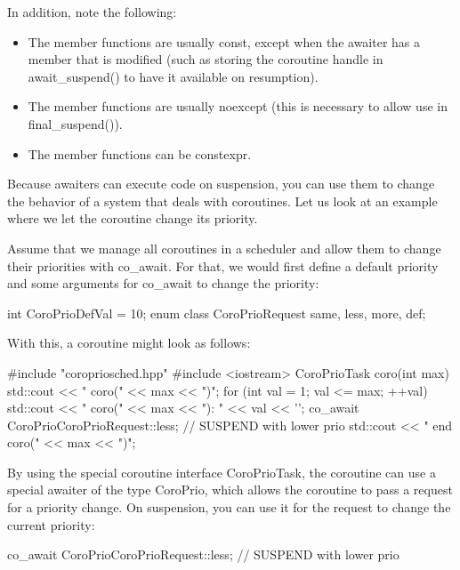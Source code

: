 In addition, note the following:

\begin{itemize}
\item 
The member functions are usually const, except when the awaiter has a member that is modified (such as storing the coroutine handle in await\_suspend() to have it available on resumption).

\item 
The member functions are usually noexcept (this is necessary to allow use in final\_suspend()).

\item 
The member functions can be constexpr.
\end{itemize}


Because awaiters can execute code on suspension, you can use them to change the behavior of a system that deals with coroutines. Let us look at an example where we let the coroutine change its priority.

Assume that we manage all coroutines in a scheduler and allow them to change their priorities with co\_await. For that, we would first define a default priority and some arguments for co\_await to change the priority:

\begin{cpp}
int CoroPrioDefVal = 10;
enum class CoroPrioRequest {same, less, more, def};
\end{cpp}

With this, a coroutine might look as follows:


\begin{cpp}
#include "coropriosched.hpp"
#include <iostream>
CoroPrioTask coro(int max)
{
	std::cout << " coro(" << max << ")\n";
	for (int val = 1; val <= max; ++val) {
		std::cout << " coro(" << max << "): " << val << '\n';
		co_await CoroPrio{CoroPrioRequest::less}; // SUSPEND with lower prio
	}
	std::cout << " end coro(" << max << ")\n";
}
\end{cpp}

By using the special coroutine interface CoroPrioTask, the coroutine can use a special awaiter of the type CoroPrio, which allows the coroutine to pass a request for a priority change. On suspension, you can use it for the request to change the current priority:

\begin{cpp}
co_await CoroPrio{CoroPrioRequest::less}; // SUSPEND with lower prio
\end{cpp}

